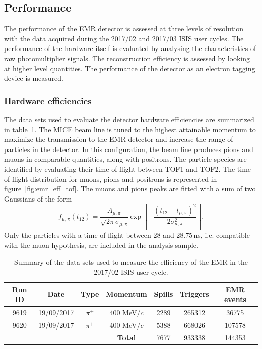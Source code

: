 \subsection{Performance}
\label{SubSect:EMR_Performance}

The performance of the EMR detector is assessed at three levels of resolution with the data acquired during the 2017/02 and 2017/03 ISIS user cycles. The performance of the hardware itself is evaluated by analysing the characteristics of raw photomultiplier signals. The reconstruction efficiency is assessed by looking at higher level quantities. The performance of the detector as an electron tagging device is measured.

\subsubsection{Hardware efficiencies}
The data sets used to evaluate the detector hardware efficiencies are summarized in table~\ref{tab:emr_eff_data_sets}. The MICE beam line is tuned to the highest attainable momentum to maximize the transmission to the EMR detector and increase the range of particles in the detector. In this configuration, the beam line produces pions and muons in comparable quantities, along with positrons. The particle species are identified by evaluating their time-of-flight between TOF1 and TOF2. The time-of-flight distribution for muons, pions and positrons is represented in figure~\ref{fig:emr_eff_tof}. The muons and pions peaks are fitted with a sum of two Gaussians of the form
\begin{equation}
f_{\mu,\pi}(t_{12}) = \frac{A_{\mu,\pi}}{\sqrt{2\pi}\sigma_{\mu,\pi}} \exp\left[-\frac{(t_{12}-t_{\mu,\pi})^2}{2\sigma_{\mu,\pi}^2}\right].
\end{equation}
Only the particles with a time-of-flight between 28 and 28.75\,ns, i.e. compatible with the muon hypothesis, are included in the analysis sample.

\begin{table}[htb!]
	\centering
	\begin{tabular}{c|c|c|c|c|c|c}
		Run ID & Date & Type & Momentum & Spills & Triggers & EMR events \\
		\hline
		9619 & 19/09/2017 & $\pi^+$ & 400 MeV/$c$ & 2289 & 265312 & 36775 \\
		9620 & 19/09/2017 & $\pi^+$ & 400 MeV/$c$ & 5388 & 668026 & 107578 \\
		\hline
		\multicolumn{3}{c}{} & \textbf{Total} & 7677 & 933338 & 144353
	\end{tabular}
	\caption{Summary of the data sets used to measure the efficiency of the EMR in the 2017/02 ISIS user cycle.}
	\label{tab:emr_eff_data_sets}
\end{table}

